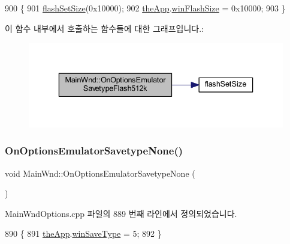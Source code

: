 \begin{DoxyCode}
900 \{
901   \mbox{\hyperlink{_flash_8cpp_a4d0a651a0b5a03da845c2fd023bef403}{flashSetSize}}(0x10000);
902   \mbox{\hyperlink{_v_b_a_8cpp_a8095a9d06b37a7efe3723f3218ad8fb3}{theApp}}.\mbox{\hyperlink{class_v_b_a_a5c99844bc4d1e5556434afaa75ae91e5}{winFlashSize}} = 0x10000;
903 \}
\end{DoxyCode}
이 함수 내부에서 호출하는 함수들에 대한 그래프입니다.\+:
\nopagebreak
\begin{figure}[H]
\begin{center}
\leavevmode
\includegraphics[width=336pt]{class_main_wnd_a10c98fcb234998c2d621585d4b244451_cgraph}
\end{center}
\end{figure}
\mbox{\label{class_main_wnd_a41903300d898006e3d52466dd2ceb283}} 
\subsubsection{\texorpdfstring{On\+Options\+Emulator\+Savetype\+None()}{OnOptionsEmulatorSavetypeNone()}}
{\footnotesize\ttfamily void Main\+Wnd\+::\+On\+Options\+Emulator\+Savetype\+None (\begin{DoxyParamCaption}{ }\end{DoxyParamCaption})\hspace{0.3cm}{\ttfamily [protected]}}



Main\+Wnd\+Options.\+cpp 파일의 889 번째 라인에서 정의되었습니다.


\begin{DoxyCode}
890 \{
891   \mbox{\hyperlink{_v_b_a_8cpp_a8095a9d06b37a7efe3723f3218ad8fb3}{theApp}}.\mbox{\hyperlink{class_v_b_a_a70060f88010280739406c87ef66d036a}{winSaveType}} = 5;
892 \}
\end{DoxyCode}
\mbox{\label{class_main_wnd_a3599dc0ef10dceab417ada2584cb18e6}} 
